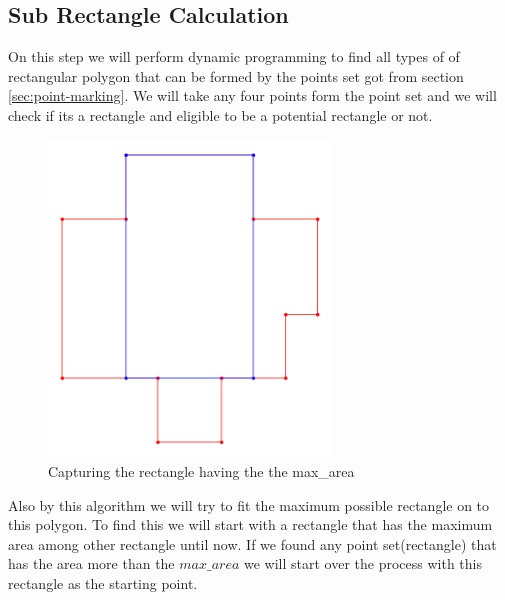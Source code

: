 \documentclass[a4paper,17pt]{article}
\begin{document}
\subsection{Sub Rectangle Calculation}
On this step we will perform dynamic programming to find all types of of rectangular polygon that can be formed by the points set got from section \ref{sec:point-marking}. We will take any four points form the point set and we will check if its a rectangle and eligible to be a potential rectangle or not.
\begin{figure}[h]
\centering
\includegraphics[width=0.67\textwidth]{max-area.png}
\caption{Capturing the rectangle having the the max\_area }
\label{fig:MA}
\end{figure}
Also by this algorithm we will try to fit the maximum possible rectangle on to this polygon. To find this we will start with a rectangle that has the maximum area among other rectangle until now. If we found any point set(rectangle) that has the area more than the $max\_area$ we will start over the process with this rectangle as the starting point.
\newline
\end{document}
